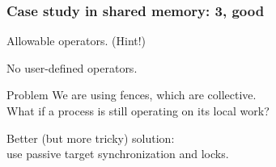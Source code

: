 \begin{mpithree}
\begin{frame}[containsverbatim]\frametitle{Case study in shared memory: 3, good}
  \label{sl:fetchacc}
\end{frame}

\begin{frame}{Allowable operators. (Hint!)}
  

  No user-defined operators.
\end{frame}

\begin{frame}{Problem}
  We are using fences, which are collective.\\
  What if a process is still operating on its local work?

  Better (but more tricky) solution:\\
  use passive target synchronization and locks.
\end{frame}

\begin{exerciseframe}[lockfetch]
  
\end{exerciseframe}

\begin{exerciseframe}[lockfetchshared]
  
\end{exerciseframe}

\end{mpithree}

\endinput

\begin{frame}[containsverbatim]\frametitle{}
  \label{sl:}
\end{frame}

\begin{optexerciseframe}
  
\end{optexerciseframe}

